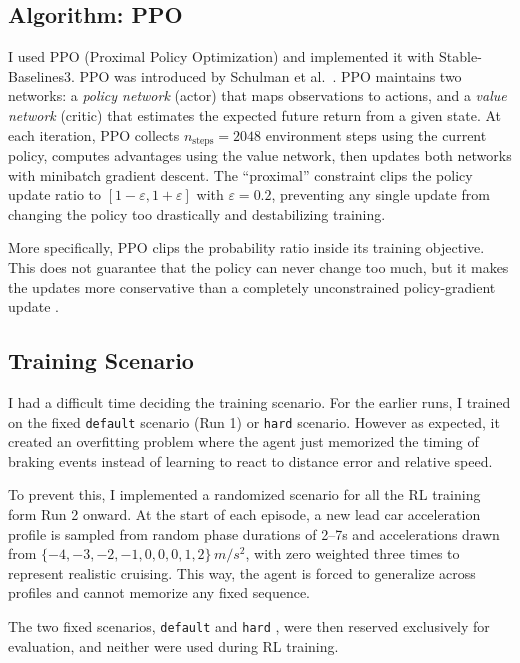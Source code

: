 \documentclass{article}
\begin{document}
\subsection*{Algorithm: PPO}

I used PPO (Proximal Policy Optimization) and implemented it with Stable-Baselines3. PPO was introduced by Schulman et al.\ \cite{schulman2017ppo}. PPO maintains two networks: a \textit{policy network} (actor) that maps observations to actions, and a \textit{value network} (critic) that estimates the expected future return from a given state. At each iteration, PPO collects $n_{\text{steps}} = 2048$ environment steps using the current policy, computes advantages using the value network, then updates both networks with minibatch gradient descent. The ``proximal'' constraint clips the policy update ratio to $[1 - \varepsilon, 1 + \varepsilon]$ with $\varepsilon = 0.2$, preventing any single update from changing the policy too drastically and destabilizing training.

More specifically, PPO clips the probability ratio inside its training objective. This does not guarantee that the policy can never change too much, but it makes the updates more conservative than a completely unconstrained policy-gradient update \cite{schulman2017ppo}.


\subsection*{Training Scenario}

I had a difficult time deciding the training scenario. For the earlier runs, I trained on the fixed \texttt{default} scenario (Run 1) or \texttt{hard} scenario. However as expected, it created an overfitting problem where the agent just memorized the timing of braking events instead of learning to react to distance error and relative speed. 

To prevent this, I implemented a randomized scenario for all the RL training form Run 2 onward. At the start of each episode, a new lead car acceleration profile is sampled from random phase durations of 2--7s and accelerations drawn from $\{-4,-3,-2,-1,0,0,0,1,2\}\,\si{m/s^2}$, with zero weighted three times to represent realistic cruising. This way, the agent is forced to generalize across profiles and cannot memorize any fixed sequence.

The two fixed scenarios, \texttt{default} and \texttt{hard} , were then reserved exclusively for evaluation, and neither were used during RL training.
\end{document}
